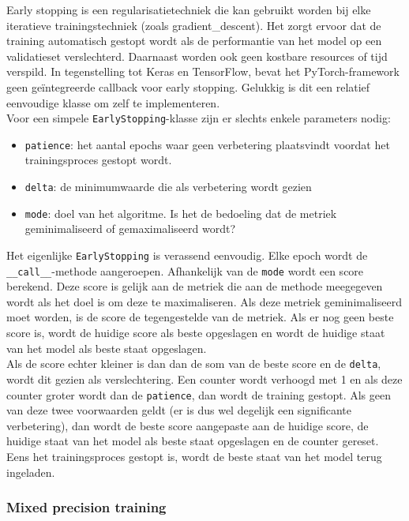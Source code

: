Early stopping is een regularisatietechniek die kan gebruikt worden bij elke iteratieve trainingstechniek (zoals \gls{gradient_descent}). Het zorgt ervoor dat de training automatisch gestopt wordt als de performantie van het model op een validatieset verslechterd. Daarnaast worden ook geen kostbare resources of tijd verspild. \autocite{Prechelt_1998} In tegenstelling tot Keras en TensorFlow, bevat het PyTorch-framework geen geïntegreerde callback voor early stopping. Gelukkig is dit een relatief eenvoudige klasse om zelf te implementeren. \\

Voor een simpele \texttt{EarlyStopping}-klasse zijn er slechts enkele parameters nodig: 

\begin{itemize}
    \item \texttt{patience}: het aantal epochs waar geen verbetering plaatsvindt voordat het trainingsproces gestopt wordt.
    \item \texttt{delta}: de minimumwaarde die als verbetering wordt gezien
    \item \texttt{mode}: doel van het algoritme. Is het de bedoeling dat de metriek geminimaliseerd of gemaximaliseerd wordt?
\end{itemize}

Het eigenlijke \texttt{EarlyStopping} is verassend eenvoudig. Elke epoch wordt de \texttt{\_\_call\_\_}-methode aangeroepen. Afhankelijk van de \texttt{mode} wordt een score berekend. Deze score is gelijk aan de metriek die aan de methode meegegeven wordt als het doel is om deze te maximaliseren. Als deze metriek geminimaliseerd moet worden, is de score de tegengestelde van de metriek. Als er nog geen beste score is, wordt de huidige score als beste opgeslagen en wordt de huidige staat van het model als beste staat opgeslagen. \\

Als de score echter kleiner is dan dan de som van de beste score en de \texttt{delta}, wordt dit gezien als verslechtering. Een counter wordt verhoogd met 1 en als deze counter groter wordt dan de \texttt{patience}, dan wordt de training gestopt. Als geen van deze twee voorwaarden geldt (er is dus wel degelijk een significante verbetering), dan wordt de beste score aangepaste aan de huidige score, de huidige staat van het model als beste staat opgeslagen en de counter gereset. Eens het trainingsproces gestopt is, wordt de beste staat van het model terug ingeladen.

\subsubsection{Mixed precision training}

